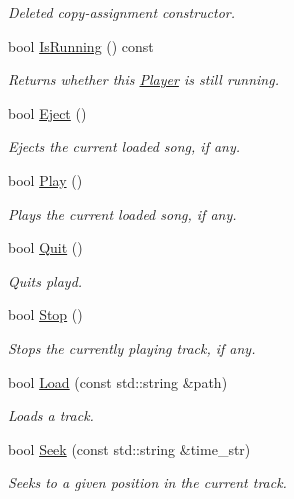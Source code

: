 \begin{DoxyCompactItemize}
\begin{DoxyCompactList}\small\item\em Deleted copy-\/assignment constructor. \end{DoxyCompactList}\item 
bool \hyperlink{classPlayer_a0688e00b9fa4699dbe15c370b2703a68}{Is\+Running} () const 
\begin{DoxyCompactList}\small\item\em Returns whether this \hyperlink{classPlayer}{Player} is still running. \end{DoxyCompactList}\item 
bool \hyperlink{classPlayer_ac93a5310c751e8a9221780933f7a9dd6}{Eject} ()
\begin{DoxyCompactList}\small\item\em Ejects the current loaded song, if any. \end{DoxyCompactList}\item 
bool \hyperlink{classPlayer_a1df3950102f682608482042cdea96598}{Play} ()
\begin{DoxyCompactList}\small\item\em Plays the current loaded song, if any. \end{DoxyCompactList}\item 
bool \hyperlink{classPlayer_a7d5c0535d543b358b6deecb054565b97}{Quit} ()
\begin{DoxyCompactList}\small\item\em Quits playd. \end{DoxyCompactList}\item 
bool \hyperlink{classPlayer_abe074115b0ffa631ea432a1b84171599}{Stop} ()
\begin{DoxyCompactList}\small\item\em Stops the currently playing track, if any. \end{DoxyCompactList}\item 
bool \hyperlink{classPlayer_a41c5eccb1f3b86383eaafe56a40a60e0}{Load} (const std\+::string \&path)
\begin{DoxyCompactList}\small\item\em Loads a track. \end{DoxyCompactList}\item 
bool \hyperlink{classPlayer_a873c7e0a5be71efbadeebfbc20d7448a}{Seek} (const std\+::string \&time\+\_\+str)
\begin{DoxyCompactList}\small\item\em Seeks to a given position in the current track. \end{DoxyCompactList}\item 

\end{DoxyCompactItemize}
